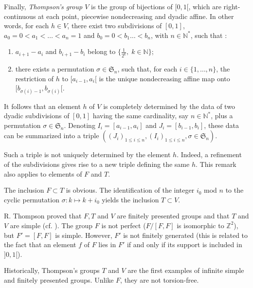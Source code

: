 \documentclass[twoside]{irmaems}
\theoremstyle{plain}
\theoremstyle{definition}
\theoremstyle{remark}
\newcommand{\Z}{{\mathbb{Z}}}
\newcommand{\N}{{\mathbb{N}}}
\begin{document}
\vspace{0.1cm}\noindent 
Finally, {\it Thompson's group  $V$}   is the group of bijections of $[0,1[$, which are right-continuous at each point, piecewise nondecreasing and dyadic affine. In other words, for each $h\in V$, there exist two subdivisions of $[0,1]$, $a_0=0<a_1<\ldots<a_n=1$ and $b_0=0<b_1\ldots<b_n$, with $n\in \N^*$, such that :
\begin{enumerate}
\item  $a_{i+1}-a_i$ and $b_{i+1}-b_i$ belong to $\{\frac{1}{2^k},\; k\in \N\}$;
\item there exists a permutation $\sigma\in \mathfrak{S}_n$, such that, for each  $i\in\{1,\ldots,n\}$, the restriction of  $h$ to $[a_{i-1},a_i[$ is the unique  nondecreasing affine map onto $[b_{\sigma(i)-1}, b_{\sigma(i)}[$.
\end{enumerate}
It follows that an element $h$ of  $V$ is completely determined by the data of two dyadic subdivisions of $[0,1]$ having the same cardinality, say $n\in \N^*$, plus a permutation $\sigma\in \mathfrak{S}_n$. Denoting $I_{i}=[a_{i-1},a_i]$ and $J_i= [b_{i-1}, b_i]$, these data can be summarized into a triple $((J_i)_{1\leq i\leq n},(I_i)_{1\leq i\leq n},\sigma\in \mathfrak{S}_n)$.

 \vspace{0.1cm}\noindent 
Such a triple is not uniquely determined by the element $h$. Indeed, a refinement of the subdivisions gives rise to a new triple defining the same $h$. This remark also applies to elements of $F$ and $T$.

 

\vspace{0.1cm}\noindent 
The inclusion  $F\subset T$ is obvious. The identification of the integer $i_{0}$ mod $n$ to the cyclic permutation $\sigma: k\mapsto k+i_{0}$ yields the inclusion $T\subset V$.

\vspace{0.1cm}\noindent 
R. Thompson proved that $F,T$ and $V$ are finitely presented groups and that $T$ and $V$ are simple  (cf. \cite{ca-fl-pa}). The group $F$ is not perfect ($F/[F,F]$ is isomorphic to $\Z^ 2$), but $F'=[F,F]$  is simple. However, $F'$ is not finitely generated (this is related to the fact that an element $f$ of  $F$ lies in $F'$ if and only if its support is included  in $]0,1[$).

\vspace{0.1cm}\noindent 
Historically, Thompson's groups $T$ and $V$ are the first examples of infinite simple and finitely presented groups. Unlike $F$, they are not torsion-free.
\end{document}
